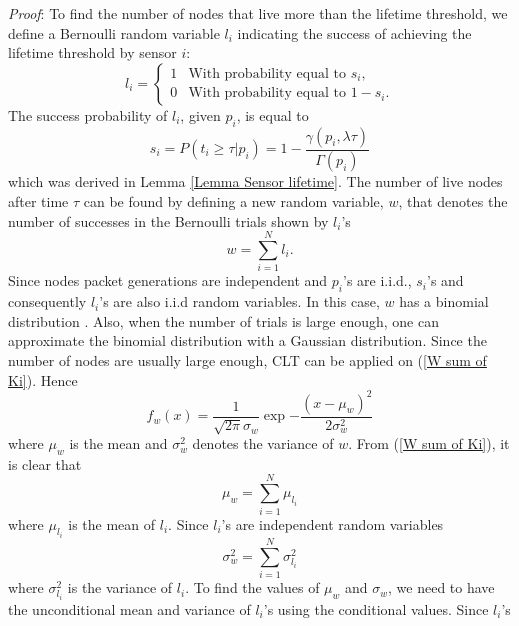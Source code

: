 \documentclass[conference]{IEEEtran}
\begin{document}
\textit{Proof}: To find the number of nodes that live more than the
lifetime threshold, we define a Bernoulli random variable $l_i$
indicating the success of achieving the lifetime threshold by sensor
$i$:
\begin{equation}\label{Bernoulli RV}
l_i= \left\{
\begin{array}{ll}
1& \text{With probability equal to $s_i$},\\
0& \text{With probability equal to $1- s_i$}.
\end{array} \right.
\end{equation}
The success probability of $l_i$, given $p_i$, is equal to
\begin{equation}\label{s_i related to gamma function}
s_i = P(t_i \geq \tau \vert p_i) = 1 - \frac{\gamma (p_i,\lambda
\tau)}{\Gamma(p_i)}
\end{equation}
which was derived in Lemma \ref{Lemma Sensor lifetime}. The number
of live nodes after time $\tau$ can be found by defining a new
random variable, $w$, that denotes the number of successes in the
Bernoulli trials shown by $l_i$'s
\begin{equation}\label{W sum of Ki}
w = \sum_{i=1}^N l_i.
\end{equation}
Since nodes packet generations are independent and $p_i$'s are
i.i.d., $s_i$'s and consequently $l_i$'s are also i.i.d random
variables. In this case, $w$ has a binomial distribution
\cite{Nedleman_Bernoulli_Statistician}. Also, when the number of
trials is large enough, one can approximate the binomial
distribution with a Gaussian distribution. Since the number of nodes
are usually large enough, CLT can be applied on (\ref{W sum of Ki}).
Hence
\begin{equation}\label{Dist of W}
f_w(x)= \frac{1}{\sqrt{2\pi}\sigma_w}
\exp{-\frac{(x-\mu_w)^2}{2\sigma_w^2}}
\end{equation}
where $\mu_w$ is the mean and $\sigma_w^2$ denotes the variance of
$w$. From (\ref{W sum of Ki}), it is clear that
\begin{equation}\label{Mean of W}
\mu_w = \sum_{i=1}^N \mu_{l_i}
\end{equation}
where $\mu_{l_i}$ is the mean of $l_i$. Since $l_i$'s are
independent random variables
\begin{equation}\label{Var of W}
\sigma_w^2 = \sum_{i=1}^N \sigma_{l_i}^2
\end{equation}
where $\sigma_{l_i}^2$ is the variance of $l_i$. To find the values
of $\mu_w$ and $\sigma_w$, we need to have the unconditional mean
and variance of $l_i$'s using the conditional values. Since $l_i$'s
\end{document}
